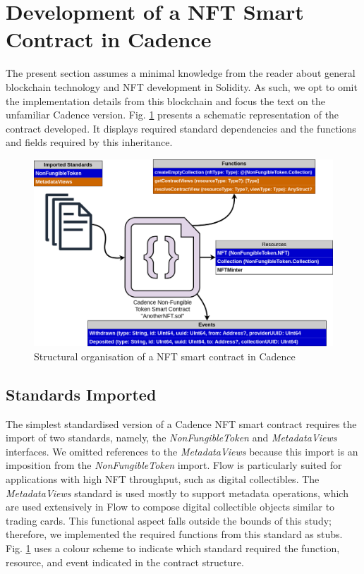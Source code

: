 \documentclass[../NFTComp_IEEE.tex]{subfiles}
\begin{document}
\section{Development of a NFT Smart Contract in Cadence}
\label{sec:cadence_development}
The present section assumes a minimal knowledge from the reader about general blockchain technology and NFT development in Solidity. As such, we opt to omit the implementation details from this blockchain and focus the text on the unfamiliar Cadence version. Fig. \ref{fig:cadence_nft_contract} presents a schematic representation of the contract developed. It displays required standard dependencies and the functions and fields required by this inheritance.

\begin{figure}[h!]
    \centering
    \includegraphics[width=\columnwidth]{Images/almei1.png}
    \caption{Structural organisation of a NFT smart contract in Cadence}
    \label{fig:cadence_nft_contract}
\end{figure}

\subsection{Standards Imported}
The simplest standardised version of a Cadence NFT smart contract requires the import of two standards, namely, the \textit{NonFungibleToken} and \textit{MetadataViews} interfaces. We omitted references to the \textit{MetadataViews} because this import is an imposition from the \textit{NonFungibleToken} import. Flow is particularly suited for applications with high NFT throughput, such as digital collectibles. The \textit{MetadataViews} standard is used mostly to support metadata operations, which are used extensively in Flow to compose digital collectible objects similar to trading cards. This functional aspect falls outside the bounds of this study; therefore, we implemented the required functions from this standard as stubs. Fig. \ref{fig:cadence_nft_contract} uses a colour scheme to indicate which standard required the function, resource, and event indicated in the contract structure.
\end{document}

